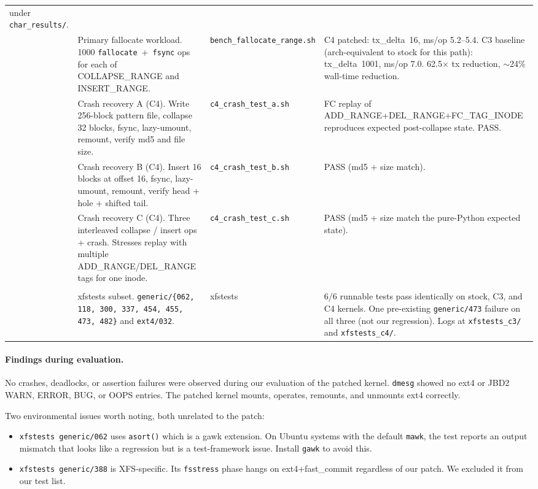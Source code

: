 \documentclass[11pt,a4paper]{article}
\begin{document}
\begin{center}
\begin{tabularx}{\textwidth}{lXXX}
  under \texttt{char\_results/}. \\
\addlinespace
7 & Primary fallocate workload. 1000
  \texttt{fallocate}~+~\texttt{fsync} ops for each of
  COLLAPSE\_RANGE and INSERT\_RANGE. &
  \texttt{bench\_fallocate\_range.sh} &
  C4 patched: tx\_delta~16, ms/op 5.2--5.4. C3 baseline (arch-equivalent
  to stock for this path): tx\_delta~1001, ms/op 7.0. 62.5$\times$ tx
  reduction, $\sim$24\% wall-time reduction. \\
\addlinespace
8 & Crash recovery A (C4). Write 256-block pattern file, collapse 32
  blocks, fsync, lazy-umount, remount, verify md5 and file size. &
  \texttt{c4\_crash\_test\_a.sh} &
  FC replay of ADD\_RANGE+DEL\_RANGE+FC\_TAG\_INODE reproduces
  expected post-collapse state. PASS. \\
\addlinespace
9 & Crash recovery B (C4). Insert 16 blocks at offset 16, fsync,
  lazy-umount, remount, verify head + hole + shifted tail. &
  \texttt{c4\_crash\_test\_b.sh} & PASS (md5 + size match). \\
\addlinespace
10 & Crash recovery C (C4). Three interleaved collapse / insert ops
  + crash. Stresses replay with multiple ADD\_RANGE/DEL\_RANGE
  tags for one inode. &
  \texttt{c4\_crash\_test\_c.sh} & PASS (md5 + size match the
  pure-Python expected state). \\
\addlinespace
\multicolumn{4}{l}{\textit{Regression gate, applies to both patches}} \\
\addlinespace
11 & xfstests subset. \texttt{generic/\{062, 118, 300, 337, 454,
  455, 473, 482\}} and \texttt{ext4/032}. &
  xfstests & 6/6 runnable tests pass identically on stock, C3, and
  C4 kernels. One pre-existing \texttt{generic/473} failure on all
  three (not our regression). Logs at
  \texttt{xfstests\_c3/} and \texttt{xfstests\_c4/}. \\
\bottomrule
\end{tabularx}
\end{center}

\paragraph{Findings during evaluation.} No crashes, deadlocks, or
assertion failures were observed during our evaluation of the
patched kernel. \texttt{dmesg} showed no ext4 or JBD2 WARN, ERROR,
BUG, or OOPS entries. The patched kernel mounts, operates, remounts,
and unmounts ext4 correctly.

Two environmental issues worth noting, both unrelated to the patch:
\begin{itemize}[leftmargin=*]
  \item \texttt{xfstests generic/062} uses \texttt{asort()} which
        is a gawk extension. On Ubuntu systems with the default
        \texttt{mawk}, the test reports an output mismatch that
        looks like a regression but is a test-framework issue.
        Install \texttt{gawk} to avoid this.
  \item \texttt{xfstests generic/388} is XFS-specific. Its
        \texttt{fsstress} phase hangs on ext4+fast\_commit
        regardless of our patch. We excluded it from our test list.
\end{itemize}
\end{document}

